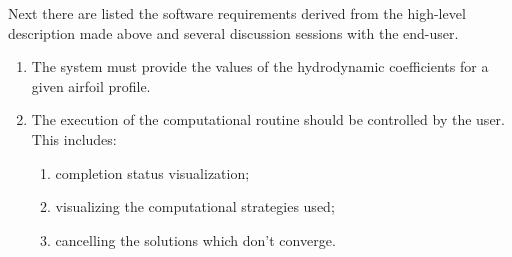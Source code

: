 Next there are listed the software requirements derived from the high-level
description made above and several discussion sessions with the end-user.

\begin{enumerate}[topsep=5pt, partopsep=0pt,itemsep=3pt,parsep=1pt]
\item The system must provide the values of the hydrodynamic coefficients
for a given airfoil profile.
\item The execution of the computational routine should be controlled by the
user. This includes:

  \begin{enumerate}
  \item completion status visualization;
  \item visualizing the computational strategies used;
  \item cancelling the solutions which don't converge.
  \end{enumerate}


\end{enumerate}
